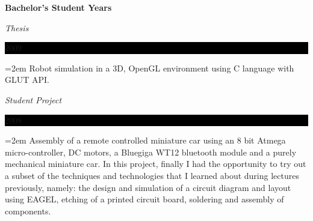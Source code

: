 \documentclass[paper=a4,fontsize=11pt]{scrartcl}	 			%
\newlength{\spacebox}
\newcommand{\sepspace}{\vspace*{1em}}			%
\newcommand{\NewPart}[1]{\section*{\uppercase{#1}}}
\newcommand{\PersonalEntry}[2]{
		\noindent\hangindent=2em\hangafter=0 		%
		\parbox{\spacebox}{						%
		\textit{#1}}								%
		\hspace{1.5em} #2 \par}					%
\newcommand{\SkillsEntry}[2]{						%
		\noindent\hangindent=2em\hangafter=0 		%
		\parbox{\spacebox}{						%
		\textit{#1}}								%
		\hspace{1.5em} #2 \par}					%
\newcommand{\EducationEntry}[4]{
		\noindent \textbf{#1} \par 					%
		\noindent \textit{#3} \hfill					%
		\colorbox{Black}{%
			\parbox{6em}{%
			\hfill\color{White}#2}} \par				%
		\noindent\hangindent=2em\hangafter=0 \small #4 	%
		\normalsize \par}
\begin{document}
\sepspace
\EducationEntry{Bachelor's Student Years}{2009}{Thesis}{Robot simulation in a 3D, OpenGL environment using C language with GLUT API.}
\EducationEntry{}{2008}{Student Project}{Assembly of a remote controlled miniature car using an 8 bit Atmega micro-controller, DC motors, a Bluegiga WT12 bluetooth module and a purely mechanical miniature car. In this project, finally I had the opportunity to try out a subset of the techniques and technologies that I learned about during lectures previously, namely: the design and simulation of a circuit diagram and layout using EAGEL, etching of a printed circuit board, soldering and assembly of components.}


\end{document}
